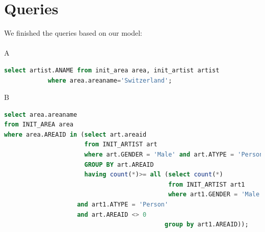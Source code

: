\documentclass[11pt]{article} %
\begin{document}
\normalsize{
\section{Queries}
We finished the queries based on our model: \\ \\
A
\begin{lstlisting}[language=SQL, keywordstyle=\color{blue!70},
commentstyle=\color{red!50!green!50!blue!50},
rulesepcolor=\color{red!20!green!20!blue!20},
frame=shadowbox]
select artist.ANAME from init_area area, init_artist artist
			where area.areaname='Switzerland';
\end{lstlisting}
B
\begin{lstlisting}[language=SQL, keywordstyle=\color{blue!70},
commentstyle=\color{red!50!green!50!blue!50},
rulesepcolor=\color{red!20!green!20!blue!20},
frame=shadowbox]
select area.areaname
from INIT_AREA area
where area.AREAID in (select art.areaid
                      from INIT_ARTIST art
                      where art.GENDER = 'Male' and art.ATYPE = 'Person' and art.AREAID <> 0
                      GROUP BY art.AREAID 
                      having count(*)>= all (select count(*)
                                             from INIT_ARTIST art1
                                             where art1.GENDER = 'Male'
					and art1.ATYPE = 'Person'
					and art.AREAID <> 0
                                            group by art1.AREAID));
             

\end{lstlisting}}
\end{document}
